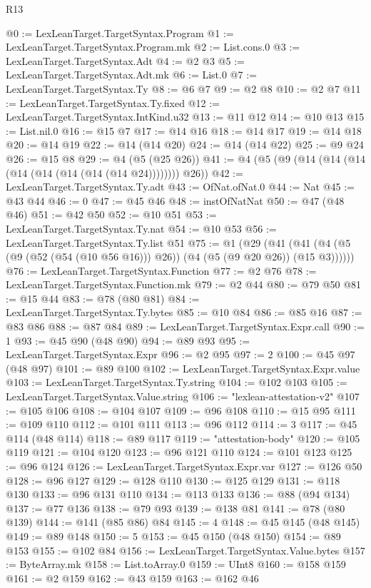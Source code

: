 \begin{lexlean}{R13}
\begin{coremodule}
@0 := LexLeanTarget.TargetSyntax.Program
@1 := LexLeanTarget.TargetSyntax.Program.mk
@2 := List.cons.{0}
@3 := LexLeanTarget.TargetSyntax.Adt
@4 := @2 @3
@5 := LexLeanTarget.TargetSyntax.Adt.mk
@6 := List.{0}
@7 := LexLeanTarget.TargetSyntax.Ty
@8 := @6 @7
@9 := @2 @8
@10 := @2 @7
@11 := LexLeanTarget.TargetSyntax.Ty.fixed
@12 := LexLeanTarget.TargetSyntax.IntKind.u32
@13 := @11 @12
@14 := @10 @13
@15 := List.nil.{0}
@16 := @15 @7
@17 := @14 @16
@18 := @14 @17
@19 := @14 @18
@20 := @14 @19
@22 := @14 (@14 @20)
@24 := @14 (@14 @22)
@25 := @9 @24
@26 := @15 @8
@29 := @4 (@5 (@25 @26))
@41 := @4 (@5 (@9 (@14 (@14 (@14 (@14 (@14 (@14 (@14 (@14 @24)))))))) @26))
@42 := LexLeanTarget.TargetSyntax.Ty.adt
@43 := OfNat.ofNat.{0}
@44 := Nat
@45 := @43 @44
@46 := 0
@47 := @45 @46
@48 := instOfNatNat
@50 := @47 (@48 @46)
@51 := @42 @50
@52 := @10 @51
@53 := LexLeanTarget.TargetSyntax.Ty.nat
@54 := @10 @53
@56 := LexLeanTarget.TargetSyntax.Ty.list @51
@75 := @1
    (@29 (@41 (@41 (@4 (@5 (@9 (@52 (@54 (@10 @56 @16))) @26)) (@4 (@5 (@9 @20 @26)) (@15 @3))))))
@76 := LexLeanTarget.TargetSyntax.Function
@77 := @2 @76
@78 := LexLeanTarget.TargetSyntax.Function.mk
@79 := @2 @44
@80 := @79 @50
@81 := @15 @44
@83 := @78 (@80 @81)
@84 := LexLeanTarget.TargetSyntax.Ty.bytes
@85 := @10 @84
@86 := @85 @16
@87 := @83 @86
@88 := @87 @84
@89 := LexLeanTarget.TargetSyntax.Expr.call
@90 := 1
@93 := @45 @90 (@48 @90)
@94 := @89 @93
@95 := LexLeanTarget.TargetSyntax.Expr
@96 := @2 @95
@97 := 2
@100 := @45 @97 (@48 @97)
@101 := @89 @100
@102 := LexLeanTarget.TargetSyntax.Expr.value
@103 := LexLeanTarget.TargetSyntax.Ty.string
@104 := @102 @103
@105 := LexLeanTarget.TargetSyntax.Value.string
@106 := "lexlean-attestation-v2"
@107 := @105 @106
@108 := @104 @107
@109 := @96 @108
@110 := @15 @95
@111 := @109 @110
@112 := @101 @111
@113 := @96 @112
@114 := 3
@117 := @45 @114 (@48 @114)
@118 := @89 @117
@119 := "attestation-body"
@120 := @105 @119
@121 := @104 @120
@123 := @96 @121 @110
@124 := @101 @123
@125 := @96 @124
@126 := LexLeanTarget.TargetSyntax.Expr.var
@127 := @126 @50
@128 := @96 @127
@129 := @128 @110
@130 := @125 @129
@131 := @118 @130
@133 := @96 @131 @110
@134 := @113 @133
@136 := @88 (@94 @134)
@137 := @77 @136
@138 := @79 @93
@139 := @138 @81
@141 := @78 (@80 @139)
@144 := @141 (@85 @86) @84
@145 := 4
@148 := @45 @145 (@48 @145)
@149 := @89 @148
@150 := 5
@153 := @45 @150 (@48 @150)
@154 := @89 @153
@155 := @102 @84
@156 := LexLeanTarget.TargetSyntax.Value.bytes
@157 := ByteArray.mk
@158 := List.toArray.{0}
@159 := UInt8
@160 := @158 @159
@161 := @2 @159
@162 := @43 @159
@163 := @162 @46

\end{coremodule}
\end{lexlean}
